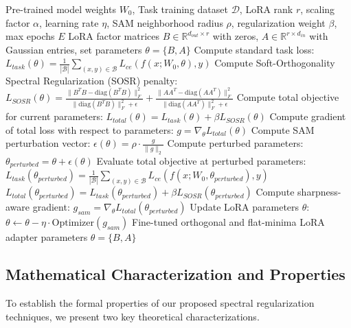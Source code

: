 \documentclass{article}
\begin{document}
\begin{algorithm}[tb]
   \caption{SATA-LR-Soft: Sharpness-Aware Task Fine-Tuning with Soft-Orthogonality Spectral Regularization}
   \label{alg:sata_lr_soft}
\begin{algorithmic}[1]
    Pre-trained model weights $W_0$, Task training dataset $\mathcal{D}$, LoRA rank $r$, scaling factor $\alpha$, learning rate $\eta$, SAM neighborhood radius $\rho$, regularization weight $\beta$, max epochs $E$
    LoRA factor matrices $B \in \mathbb{R}^{d_{out} \times r}$ with zeros, $A \in \mathbb{R}^{r \times d_{in}}$ with Gaussian entries, set parameters $\theta = \{B, A\}$
       \STATE Compute standard task loss: $L_{task}(\theta) = \frac{1}{|\mathcal{B}|} \sum_{(x, y) \in \mathcal{B}} L_{ce}(f(x; W_0, \theta), y)$
       \STATE Compute Soft-Orthogonality Spectral Regularization (SOSR) penalty:
       \STATE $L_{SOSR}(\theta) = \frac{\|B^T B - \text{diag}(B^T B)\|_F^2}{\|\text{diag}(B^T B)\|_F^2 + \epsilon} + \frac{\|A A^T - \text{diag}(A A^T)\|_F^2}{\|\text{diag}(A A^T)\|_F^2 + \epsilon}$
       \STATE Compute total objective for current parameters:
       \STATE $L_{total}(\theta) = L_{task}(\theta) + \beta L_{SOSR}(\theta)$
       \STATE Compute gradient of total loss with respect to parameters:
       \STATE $g = \nabla_{\theta} L_{total}(\theta)$
       \STATE Compute SAM perturbation vector:
       \STATE $\epsilon(\theta) = \rho \cdot \frac{g}{\|g\|_2}$
       \STATE Compute perturbed parameters: $\theta_{perturbed} = \theta + \epsilon(\theta)$
       \STATE Evaluate total objective at perturbed parameters:
       \STATE $L_{task}(\theta_{perturbed}) = \frac{1}{|\mathcal{B}|} \sum_{(x, y) \in \mathcal{B}} L_{ce}(f(x; W_0, \theta_{perturbed}), y)$
       \STATE $L_{total}(\theta_{perturbed}) = L_{task}(\theta_{perturbed}) + \beta L_{SOSR}(\theta_{perturbed})$
       \STATE Compute sharpness-aware gradient:
       \STATE $g_{sam} = \nabla_{\theta} L_{total}(\theta_{perturbed})$
       \STATE Update LoRA parameters $\theta$:
       \STATE $\theta \leftarrow \theta - \eta \cdot \text{Optimizer}(g_{sam})$
     \ENDFOR
   \ENDFOR
    Fine-tuned orthogonal and flat-minima LoRA adapter parameters $\theta = \{B, A\}$
\end{algorithmic}
\end{algorithm}

\subsection{Mathematical Characterization and Properties}
To establish the formal properties of our proposed spectral regularization techniques, we present two key theoretical characterizations.
\end{document}
